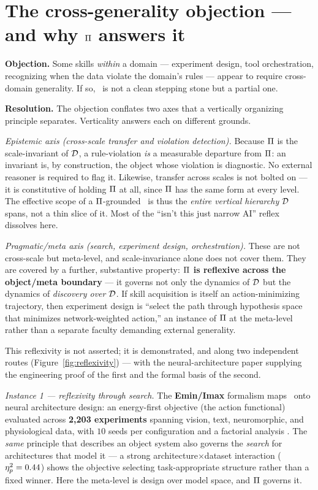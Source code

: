 \section{The cross-generality objection --- and why $\Pi$ answers it}
\label{sec:cross}

\textbf{Objection.} Some skills \emph{within} a domain --- experiment design, tool orchestration, recognizing when the data violate the domain's rules --- appear to require cross-domain generality. If so, \DCI\ is not a clean stepping stone but a partial one.

\textbf{Resolution.} The objection conflates two axes that a vertically organizing principle separates. Verticality answers each on different grounds.

\emph{Epistemic axis (cross-scale transfer and violation detection).} Because $\Pi$ is the scale-invariant of $\mathcal{D}$, a rule-violation \emph{is} a measurable departure from $\Pi$: an invariant is, by construction, the object whose violation is diagnostic. No external reasoner is required to flag it. Likewise, transfer across scales is not bolted on --- it is constitutive of holding $\Pi$ at all, since $\Pi$ has the same form at every level. The effective scope of a $\Pi$-grounded \DCI\ is thus the \emph{entire vertical hierarchy} $\mathcal{D}$ spans, not a thin slice of it. Most of the ``isn't this just narrow AI'' reflex dissolves here.

\emph{Pragmatic/meta axis (search, experiment design, orchestration).} These are not cross-scale but meta-level, and scale-invariance alone does not cover them. They are covered by a further, substantive property: \textbf{$\Pi$ is reflexive across the object/meta boundary} --- it governs not only the dynamics of $\mathcal{D}$ but the dynamics of \emph{discovery over} $\mathcal{D}$. If skill acquisition is itself an action-minimizing trajectory, then experiment design is ``select the path through hypothesis space that minimizes network-weighted action,'' an instance of $\Pi$ at the meta-level rather than a separate faculty demanding external generality.

This reflexivity is not asserted; it is demonstrated, and along two independent routes (Figure~\ref{fig:reflexivity}) --- with the neural-architecture paper \citep{frasch2026c} supplying the engineering proof of the first and the formal basis of the second.

\emph{Instance 1 --- reflexivity through search.} The \textbf{Emin/Imax} formalism maps \NWAP\ onto neural architecture design: an energy-first objective (the action functional) evaluated across \textbf{2{,}203 experiments} spanning vision, text, neuromorphic, and physiological data, with $10$ seeds per configuration and a factorial analysis \citep{frasch2026c}. The \emph{same} principle that describes an object system also governs the \emph{search} for architectures that model it --- a strong architecture$\times$dataset interaction ($\eta^{2}_{p} = 0.44$) shows the objective selecting task-appropriate structure rather than a fixed winner. Here the meta-level is design over model space, and $\Pi$ governs it.

